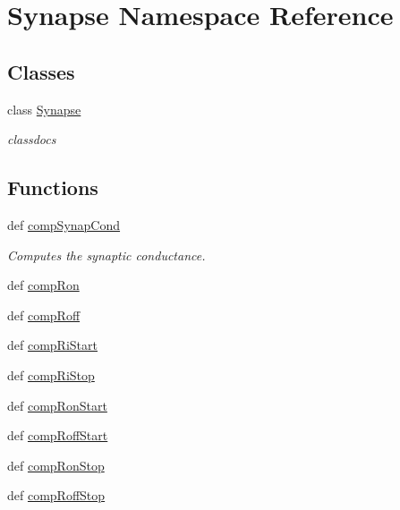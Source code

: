 \hypertarget{namespace_synapse}{\section{Synapse Namespace Reference}
\label{namespace_synapse}
}
\subsection*{Classes}
\begin{DoxyCompactItemize}
\item 
class \hyperlink{class_synapse_1_1_synapse}{Synapse}
\begin{DoxyCompactList}\small\item\em classdocs \end{DoxyCompactList}\end{DoxyCompactItemize}
\subsection*{Functions}
\begin{DoxyCompactItemize}
\item 
def \hyperlink{namespace_synapse_a55ffd471fbed3550b464a9862687f541}{comp\-Synap\-Cond}
\begin{DoxyCompactList}\small\item\em Computes the synaptic conductance. \end{DoxyCompactList}\item 
def \hyperlink{namespace_synapse_a16fdc8aab9a394041c8b6667511a1fd7}{comp\-Ron}
\item 
def \hyperlink{namespace_synapse_aadfeb939e02125a55a2b2acc6634ba41}{comp\-Roff}
\item 
def \hyperlink{namespace_synapse_a6d5943c0d974d992b8c9daa3ff3818d6}{comp\-Ri\-Start}
\item 
def \hyperlink{namespace_synapse_a67ee3bb7abbf9608bd83c31c63634cac}{comp\-Ri\-Stop}
\item 
def \hyperlink{namespace_synapse_a3bbc4948087cc789af35085ea0423a93}{comp\-Ron\-Start}
\item 
def \hyperlink{namespace_synapse_a4ff37207e236e81ae7bced77172a5af5}{comp\-Roff\-Start}
\item 
def \hyperlink{namespace_synapse_a9915f1de7bde4ece67ef45a7e7324c21}{comp\-Ron\-Stop}
\item 
def \hyperlink{namespace_synapse_a8e85651ec0d366f191a2093a1bd2bc84}{comp\-Roff\-Stop}
\end{DoxyCompactItemize}


